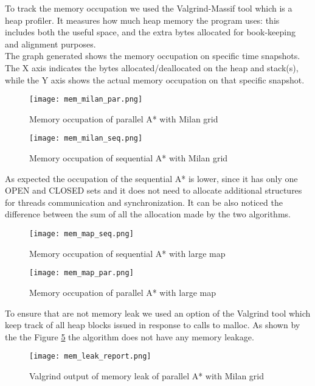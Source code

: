 To track the memory occupation we used the Valgrind-Massif tool which is a heap profiler. It measures how much heap memory the program uses: this includes both the useful space,
and the extra bytes allocated for book-keeping and alignment purposes.
\\
The graph generated shows the memory occupation on specific time snapshots. The X axis indicates the bytes allocated/deallocated on the heap and stack(s), while the Y axis shows the actual memory occupation on that specific snapshot.


\begin{figure}
    \centering
    \texttt{[image: mem\_milan\_par.png]}
    \caption{Memory occupation of parallel A* with Milan grid}
    \label{mem-par-milan}
\end{figure}


\begin{figure}
    \centering
    \texttt{[image: mem\_milan\_seq.png]}
    \caption{Memory occupation of sequential A* with Milan grid}
    \label{mem-seq-milan}
\end{figure}

As expected the occupation of the sequential A* is lower, since it has only one OPEN and CLOSED sets and it does not need to allocate additional structures for threads communication and synchronization.
It can be also noticed the difference between the sum of all the allocation made by the two algorithms.



\begin{figure}
    \centering
    \texttt{[image: mem\_map\_seq.png]}
    \caption{Memory occupation of sequential A* with large map}
    \label{mem-seq-map}
\end{figure}

\begin{figure}
    \centering
    \texttt{[image: mem\_map\_par.png]}
    \caption{Memory occupation of parallel A* with large map}
    \label{mem-par-map}
\end{figure}


To ensure that are not memory leak we used an option of the Valgrind tool which keep track of all heap blocks issued in response to calls to malloc.
As shown by the the Figure \ref{mem-leak-milan} the algorithm does not have any memory leakage.

\begin{figure}
    \centering
    \texttt{[image: mem\_leak\_report.png]}
    \caption{Valgrind output of memory leak of parallel A* with Milan grid}
    \label{mem-leak-milan}
\end{figure}



